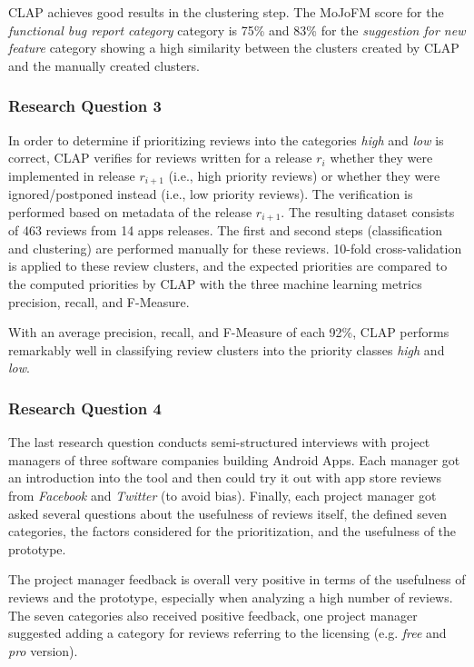 CLAP achieves good results in the clustering step. The MoJoFM score for the \textit{functional bug report category} category is 75\% and 83\% for the \textit{suggestion for new feature} category showing a high similarity between the clusters created by CLAP and the manually created clusters.

\subsubsection{Research Question 3}

In order to determine if prioritizing reviews into the categories \textit{high} and \textit{low} is correct, CLAP verifies for reviews written for a release $r_i$ whether they were implemented in release $r_{i+1}$ (i.e., high priority reviews) or whether they were ignored/postponed instead (i.e., low priority reviews). The verification is performed based on metadata of the release $r_{i+1}$. The resulting dataset consists of 463 reviews from 14 apps releases. The first and second steps (classification and clustering) are performed manually for these reviews. 10-fold cross-validation is applied to these review clusters, and the expected priorities are compared to the computed priorities by CLAP with the three machine learning metrics precision, recall, and F-Measure. 

With an average precision, recall, and F-Measure of each 92\%, CLAP performs remarkably well in classifying review clusters into the priority classes \textit{high} and \textit{low}.


\subsubsection{Research Question 4}

The last research question conducts semi-structured interviews with project managers of three software companies building Android Apps. 
Each manager got an introduction into the tool and then could try it out with app store reviews from \textit{Facebook} and \textit{Twitter} (to avoid bias). Finally, each project manager got asked several questions about the usefulness of reviews itself, the defined seven categories, the factors considered for the prioritization, and the usefulness of the prototype.

The project manager feedback is overall very positive in terms of the usefulness of reviews and the prototype, especially when analyzing a high number of reviews. The seven categories also received positive feedback, one project manager suggested adding a category for reviews referring to the licensing (e.g. \textit{free} and \textit{pro} version).

